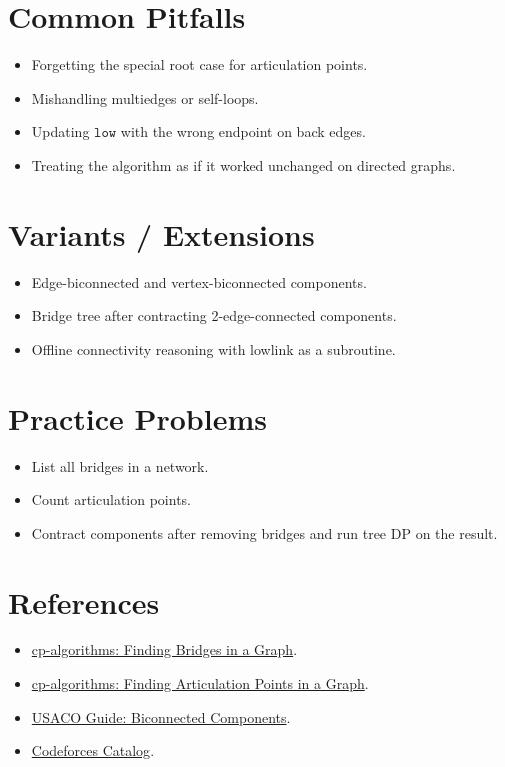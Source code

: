 \section*{Common Pitfalls}

\begin{itemize}
  \item Forgetting the special root case for articulation points.
  \item Mishandling multiedges or self-loops.
  \item Updating \(\texttt{low}\) with the wrong endpoint on back edges.
  \item Treating the algorithm as if it worked unchanged on directed graphs.
\end{itemize}

\section*{Variants / Extensions}

\begin{itemize}
  \item Edge-biconnected and vertex-biconnected components.
  \item Bridge tree after contracting 2-edge-connected components.
  \item Offline connectivity reasoning with lowlink as a subroutine.
\end{itemize}

\section*{Practice Problems}

\begin{itemize}
  \item List all bridges in a network.
  \item Count articulation points.
  \item Contract components after removing bridges and run tree DP on the result.
\end{itemize}

\section*{References}

\begin{itemize}
  \item \href{https://cp-algorithms.com/graph/bridge-searching.html}{cp-algorithms: Finding Bridges in a Graph}.
  \item \href{https://cp-algorithms.com/graph/cutpoints.html}{cp-algorithms: Finding Articulation Points in a Graph}.
  \item \href{https://usaco.guide/adv/BCC-2CC}{USACO Guide: Biconnected Components}.
  \item \href{https://codeforces.com/catalog}{Codeforces Catalog}.
\end{itemize}
